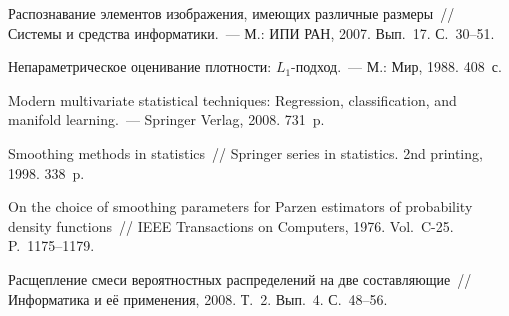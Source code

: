 \begin{multicols}{2}
{\small\frenchspacing
{%
\begin{thebibliography}{9}

Распознавание элементов изображения, имеющих различные размеры~// Системы и средства 
информатики.~--- М.: ИПИ РАН, 2007. Вып.~17. С.~30--51.

Непараметрическое оценивание плотности: $L_1$-подход.~--- М.: Мир, 1988.  408~с.

Modern multivariate statistical techniques: Regression, classification, and manifold learning.~--- Springer 
Verlag, 2008.  731~p.

Smoothing methods in statistics~// Springer series in statistics. 2nd printing, 1998.  338~p.

On the choice of smoothing parameters for Parzen estimators of probability density functions~// IEEE 
Transactions on Computers, 1976. Vol.~C-25. P.~1175--1179.

\label{end\stat}

Расщепление смеси вероятностных распределений на две составляющие~// Информатика и её 
применения, 2008. Т.~2. Вып.~4. С.~48--56.
 \end{thebibliography}
}
}

\end{multicols}